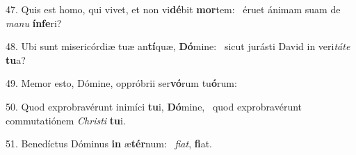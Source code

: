 47. Quis est homo, qui vivet, et non vi\textbf{dé}bit \textbf{mor}tem: \ast\  éruet ánimam suam de \textit{ma}\textit{nu} \textbf{ín}\textbf{fe}ri?\

48. Ubi sunt misericórdiæ tuæ an\textbf{tí}quæ, \textbf{Dó}mine: \ast\  sicut jurásti David in veri\textit{tá}\textit{te} \textbf{tu}a?\

49. Memor esto, Dómine, oppróbrii ser\textbf{vó}rum tu\textbf{ó}rum: \ast\  \

50. Quod exprobravérunt inimíci \textbf{tu}i, \textbf{Dó}mine, \ast\  quod exprobravérunt commutatiónem \textit{Chris}\textit{ti} \textbf{tu}i.\

51. Benedíctus Dóminus \textbf{in} æ\textbf{tér}num: \ast\  \textit{fi}\textit{at}, \textbf{fi}at.\

